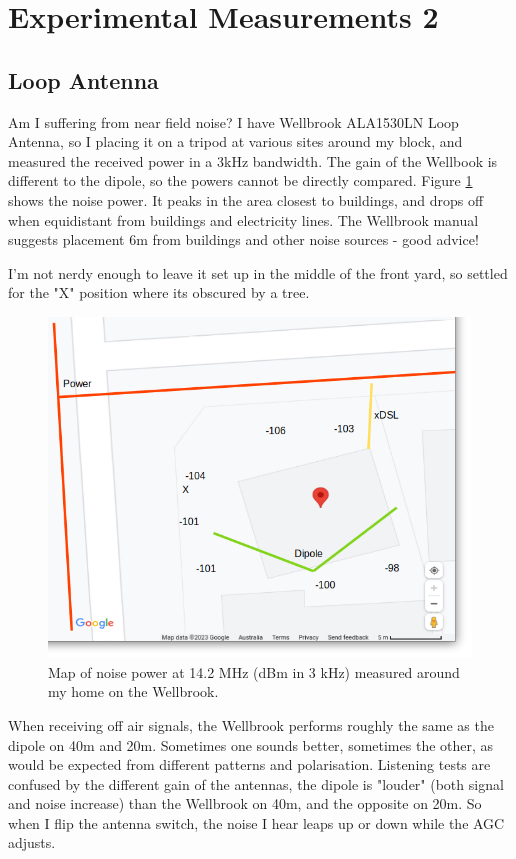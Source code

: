 \documentclass{article}
\begin{document}
\section{Experimental Measurements 2}

\subsection{Loop Antenna}

Am I suffering from near field noise? I have Wellbrook ALA1530LN Loop Antenna, so I placing it on a tripod at various sites around my block, and measured the received power in a 3kHz bandwidth. The gain of the Wellbook is different to the dipole, so the powers cannot be directly compared.  Figure \ref{fig:home_map_loop} shows the noise power.  It peaks in the area closest to buildings, and drops off when equidistant from buildings and electricity lines.  The Wellbrook manual suggests placement 6m from buildings and other noise sources - good advice!

I'm not nerdy enough to leave it set up in the middle of the front yard, so settled for the "X" position where its obscured by a tree.

\begin{figure}[h]
\caption{Map of noise power at 14.2 MHz (dBm in 3 kHz) measured around my home on the Wellbrook.}
\label{fig:home_map_loop}
\begin{center}
\includegraphics[width=12cm]{house_map_loop.png}
\end{center}
\end{figure}

When receiving off air signals, the Wellbrook performs roughly the same as the dipole on 40m and 20m.  Sometimes one sounds better, sometimes the other, as would be expected from different patterns and polarisation.  Listening tests are confused by the different gain of the antennas, the dipole is "louder" (both signal and noise increase) than the Wellbrook on 40m, and the opposite on 20m.  So when I flip the antenna switch, the noise I hear leaps up or down while the AGC adjusts.
\end{document}
